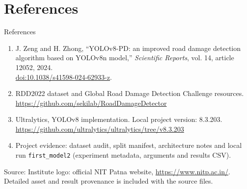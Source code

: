 \documentclass[aspectratio=169,11pt]{beamer}
\newcommand{\source}[1]{\par\vfill{\fontsize{7}{9}\selectfont\color{muted}Source: #1\par}}
\begin{document}
\section{References}
\begin{frame}{References}
\small
\begin{enumerate}\setlength\itemsep{4mm}
\item J. Zeng and H. Zhong, ``YOLOv8-PD: an improved road damage detection algorithm based on YOLOv8n model,'' \textit{Scientific Reports}, vol. 14, article 12052, 2024.\\
\href{https://doi.org/10.1038/s41598-024-62933-z}{doi:10.1038/s41598-024-62933-z}.
\item RDD2022 dataset and Global Road Damage Detection Challenge resources.\\
\url{https://github.com/sekilab/RoadDamageDetector}
\item Ultralytics, YOLOv8 implementation. Local project version: 8.3.203.\\
\url{https://github.com/ultralytics/ultralytics/tree/v8.3.203}
\item Project evidence: dataset audit, split manifest, architecture notes and local run \texttt{first\_model2} (experiment metadata, arguments and results CSV).
\end{enumerate}
\source{Institute logo: official NIT Patna website, \url{https://www.nitp.ac.in/}. Detailed asset and result provenance is included with the source files.}
\end{frame}
\end{document}
